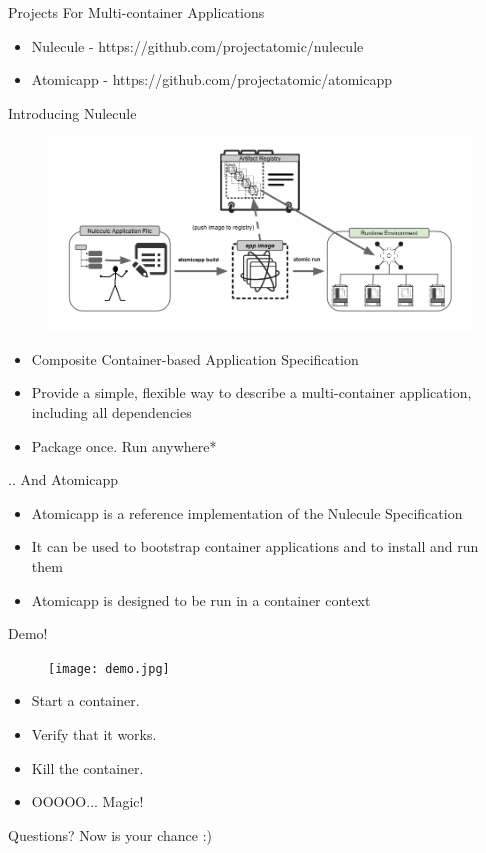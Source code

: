 \documentclass{beamer}
\begin{document}
\begin{frame}{Projects For Multi-container Applications}
\begin{itemize}
  \item Nulecule  - https://github.com/projectatomic/nulecule
  \item Atomicapp - https://github.com/projectatomic/atomicapp
\end{itemize}
\end{frame}

\begin{frame}{Introducing Nulecule}
\begin{figure}[htp]
\centering
\includegraphics[scale=0.25]{nulecule.png}
\label{}
\end{figure}
\begin{itemize}
  \item Composite Container-based Application Specification
  \item Provide a simple, flexible way to describe a multi-container application, including all dependencies
  \item Package once. Run anywhere*
\end{itemize}
\end{frame}

\begin{frame}{.. And Atomicapp}
\begin{itemize}
  \item Atomicapp is a reference implementation of the Nulecule Specification
  \item It can be used to bootstrap container applications and to install and run them
  \item Atomicapp is designed to be run in a container context
\end{itemize}
\end{frame}

\begin{frame}{Demo!}
\begin{figure}[htp]
\centering
\texttt{[image: demo.jpg]}
\label{}
\end{figure}
\begin{itemize}
  \item Start a container.
  \item Verify that it works.
  \item Kill the container.
  \item OOOOO... Magic!
\end{itemize}
\end{frame}


\begin{frame}{Questions?}
Now is your chance :)
\end{frame}
\end{document}
